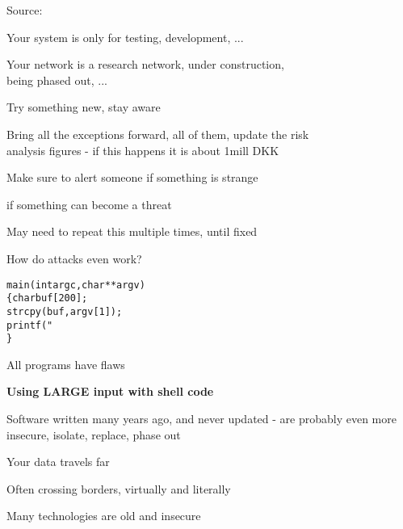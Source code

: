 \documentclass[Screen16to9,17pt,footrule]{foils}
\begin{document}
Source: 




Your system is only for testing, development, ...

Your network is a research network, under construction, \\
being phased out, ...

Try something new, stay aware

Bring all the exceptions forward, all of them, update the risk \\
analysis figures - if this happens it is about 1mill DKK

Make sure to alert someone if something is strange

if something can become a threat

May need to repeat this multiple times, until fixed



How do attacks even work?


\begin{alltt}\footnotesize
main(int argc, char **argv)
\{      char buf[200];
        strcpy(buf, argv[1]);
        printf("%s\textbackslash{}n",buf);
\}
\end{alltt}

\centerline{All programs have flaws}



\centerline{\bf\Large Using LARGE input with shell code}

Software written many years ago, and never updated - are probably even more insecure, isolate, replace, phase out



\begin{list2}
\item Your data travels far
\item Often crossing borders, virtually and literally
\item Many technologies are old and insecure
\end{list2}
\end{document}
